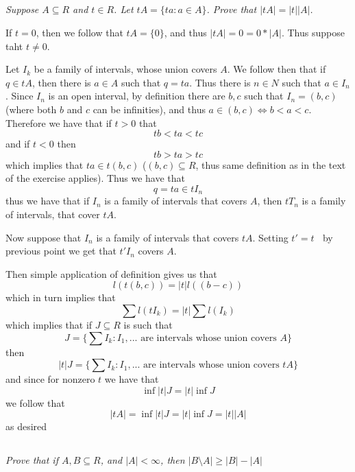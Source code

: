 \documentclass[11pt,oneside,titlepage]{book}
\DeclareMathOperator \inv {^{-1}}
\DeclareMathOperator \lra {\Leftrightarrow}
\newcommand{\set}[1]{\{ #1 \}}
\begin{document}
\subsection{}

\textit{Suppose $A \subseteq R$ and $t \in R$. Let $tA = \set{ta: a
    \in A}$. Prove that $|tA| = |t||A|$.}

If $t = 0$, then we follow that $tA = \set{0}$, and thus $|tA| = 0 = 0
* |A|$. Thus suppose taht $t \neq 0$.

Let $I_k$ be a family of intervals, whose union covers $A$. We follow
then that if $q \in tA$, then there is $a \in A$ such that $q =
ta$. Thus there is $n \in N$ such that $a \in I_n$. Since $I_n$ is an
open interval, by definition there are $b, c$ such that $I_n = (b,
c)$ (where both $b$ and $c$ can be infinities), and thus $a \in (b, c)
\lra b < a < c$. Therefore we have that if $t > 0$ that
$$tb < ta < tc$$
and if $t < 0$ then
$$tb > ta > tc$$
which implies that $ta \in t(b, c)$ ($(b, c) \subseteq R$, thus same
definition as in the text of the exercise applies). Thus we have that
$$q = ta \in tI_n$$
thus we have that if $I_n$ is a family of intervals that covers $A$, then
$tT_n$ is a family of intervals, that cover $tA$.

Now suppose that $I_n$ is a family of intervals that covers $tA$. Setting
$t' = t\inv$ by previous point we get that $t'I_n$ covers $A$.

Then simple application of definition gives us that
$$l(t(b, c)) = |t| l((b - c))$$
which in turn implies that
$$\sum{l(t I_k)} = |t| \sum{l(I_k)}$$
which implies that if $J \subseteq R$ is such that
$$J = \set{\sum{I_k}: I_1, ... \text{ are intervals whose union covers } A}$$
then
$$|t| J = \set{\sum{I_k}: I_1, ... \text{ are intervals whose union covers } tA}$$
and since for nonzero $t$ we have that
$$\inf {|t|J} = |t| \inf {J}$$
we follow that
$$|tA| = \inf {|t|J} = |t| \inf {J} = |t||A|$$
as desired

\subsection{}

\textit{Prove that if $A, B \subseteq R$, and $|A| < \infty$, then $|B
\setminus A| \geq |B| - |A|$}
\end{document}
